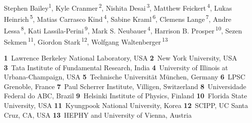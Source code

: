 \documentclass[11pt]{article}
\begin{document}
\pubblock

\snowmass{}


\medskip


\begin{center}
Stephen Bailey\textsuperscript{1},
Kyle Cranmer\,\textsuperscript{2},
Nishita Desai\,\textsuperscript{3},
Matthew Feickert\,\textsuperscript{4},
Lukas Heinrich\,\textsuperscript{5},
Matias Carrasco Kind\,\textsuperscript{4},
Sabine Kraml\,\textsuperscript{6},
Clemens Lange\,\textsuperscript{7},
Andre Lessa\,\textsuperscript{8},
Kati Lassila-Perini\,\textsuperscript{9},
Mark S. Neubauer\,\textsuperscript{4},
Harrison B. Prosper\,\textsuperscript{10},
Sezen Sekmen\,\textsuperscript{11},
Giordon Stark\,\textsuperscript{12},
Wolfgang Waltenberger\,\textsuperscript{13}
\end{center}

\begin{center}
\textbf{1}~Lawrence Berkeley National Laboratory, USA
\textbf{2}~New York University, USA
\textbf{3}~Tata Institute of Fundamental Research, India
\textbf{4}~University of Illinois at Urbana-Champaign, USA
\textbf{5}~Technische Universität München, Germany
\textbf{6}~LPSC Grenoble, France
\textbf{7}~Paul Scherrer Institute, Villigen, Switzerland
\textbf{8}~Universidade Federal do ABC, Brazil
\textbf{9}~Helsinki Institute of Physics, Finland
\textbf{10}~Florida State University, USA
\textbf{11}~Kyungpook National University, Korea
\textbf{12}~SCIPP, UC Santa Cruz, CA, USA
\textbf{13}~HEPHY and University of Vienna, Austria
\end{center}
\end{document}
